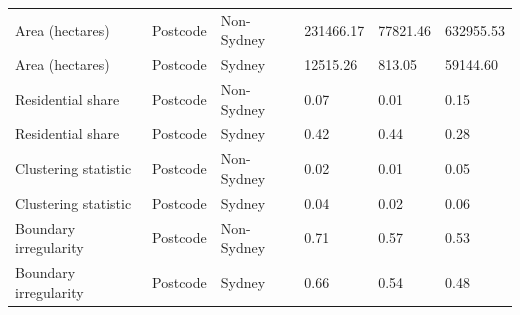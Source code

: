 \begin{table}[!htbp]
{\begin{tabular}{llllll}
Area (hectares) & Postcode & Non-Sydney & 231466.17 & 77821.46 & 632955.53 \\
Area (hectares) & Postcode & Sydney & 12515.26 & 813.05 & 59144.60 \\
Residential share & Postcode & Non-Sydney & 0.07 & 0.01 & 0.15 \\
Residential share & Postcode & Sydney & 0.42 & 0.44 & 0.28 \\
Clustering statistic & Postcode & Non-Sydney & 0.02 & 0.01 & 0.05 \\
Clustering statistic & Postcode & Sydney & 0.04 & 0.02 & 0.06 \\
Boundary irregularity & Postcode & Non-Sydney & 0.71 & 0.57 & 0.53 \\
Boundary irregularity & Postcode & Sydney & 0.66 & 0.54 & 0.48 \\
\end{tabular}
}
\par{}
\end{table}
